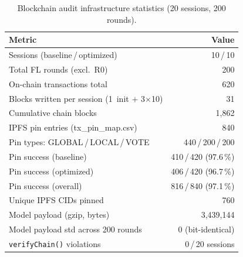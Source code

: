 \documentclass{llncs}
\begin{document}
\begin{table}[t]
\caption{Blockchain audit infrastructure statistics (20 sessions, 200 rounds).}
\label{tab:audit_stats}
\centering\footnotesize
\setlength{\tabcolsep}{4pt}
\begin{tabular}{lr}
\toprule
\textbf{Metric} & \textbf{Value} \\
\midrule
Sessions (baseline\,/\,optimized) & 10\,/\,10 \\
Total FL rounds (excl.\ R0) & 200 \\
On-chain transactions total & 620 \\
Blocks written per session (1~init $+$ 3$\times$10) & 31 \\
Cumulative chain blocks & 1{,}862 \\
\midrule
IPFS pin entries (tx\_pin\_map.csv) & 840 \\
Pin types: GLOBAL\,/\,LOCAL\,/\,VOTE & 440\,/\,200\,/\,200 \\
Pin success (baseline) & 410\,/\,420 (97.6\,\%) \\
Pin success (optimized) & 406\,/\,420 (96.7\,\%) \\
Pin success (overall) & 816\,/\,840 (97.1\,\%) \\
Unique IPFS CIDs pinned & 760 \\
Model payload (gzip, bytes) & 3{,}439{,}144 \\
Model payload std across 200 rounds & 0 (bit-identical) \\
\texttt{verifyChain()} violations & 0\,/\,20 sessions \\
\bottomrule
\end{tabular}
\end{table}
\end{document}
